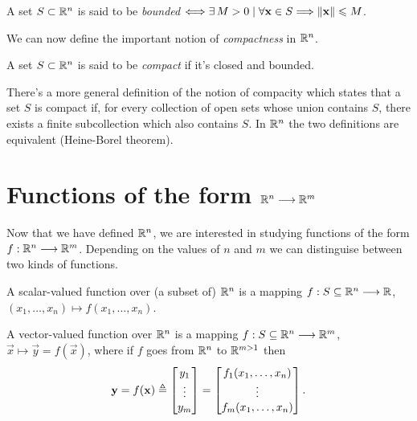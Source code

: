 \begin{defn}\label{def:bounded-set}
A set $S\subset\Rtn$ is said to be \textit{bounded} $\iff\exists M > 0\st\forall\vec{x}\in S\implies \vnorm{\vec{x}}\leq M$.
\end{defn}

We can now define the important notion of \textit{compactness} in $\Rtn$.

\begin{defn}\label{def:compact-set}
A set $S\subset\Rtn$ is said to be \textit{compact} if it's closed and bounded.
\end{defn}

\begin{note}
    There's a more general definition of the notion of compacity which states that a set $S$ is compact if, for every
    collection of open sets whose union contains $S$, there exists a finite subcollection which also contains $S$.
    In $\Rtn$ the two definitions are equivalent (Heine-Borel theorem).
\end{note}




\section{Functions of the form $\Rtn\longrightarrow\R^m$}
Now that we have defined $\Rtn$, we are interested in studying functions of the form $\stdvf$. Depending on the values of 
$n$ and $m$ we can distinguise between two kinds of functions.

\begin{defn}\label{def:scalar-function}
	A scalar-valued function over (a subset of) $\Rtn$ is a mapping $\appl{f}{S\subseteq\Rtn}{\R}$, $\left(x_1, \ldots, x_n\right)
	\longmapsto f\left(x_1, \ldots, x_n\right)$.
\end{defn}

\begin{defn}\label{def:vector-function}
	A vector-valued function over $\Rtn$ is a mapping $\appl{f}{S\subseteq\Rtn}{\R^m}$, $\vec{x}\longmapsto\vec{y} = f(\vec{x})$, where
	if $f$ goes from $\Rtn$ to $\R^{m>1}$ then
	\begin{equation}
		\mathbf{y} = f(\mathbf{x})\triangleq\begin{bmatrix}y_1 \\ \vdots \\ y_m \end{bmatrix} = \begin{bmatrix}f_1(x_1, \ldots, x_n) \\
		\vdots \\ f_m(x_1, \ldots, x_n)\end{bmatrix}.
	\end{equation}
\end{defn}

